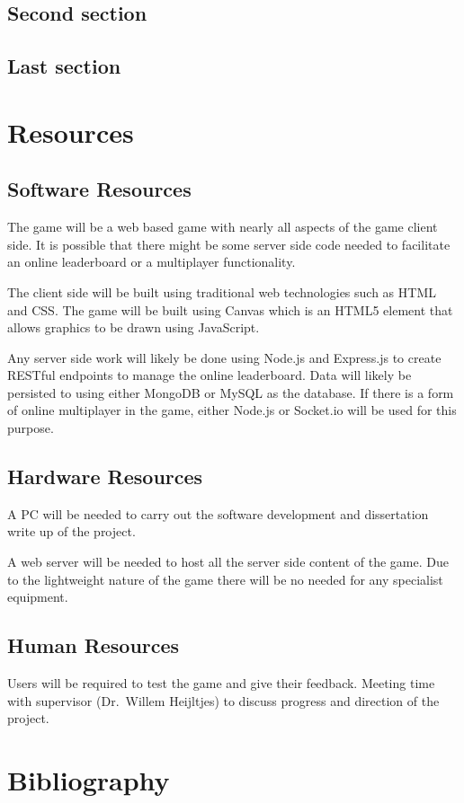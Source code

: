 \documentclass[12pt,a4paper]{report}
\begin{document}
\section{Second section}
\section{Last section}

\chapter{Resources}
\section{Software Resources}
The game will be a web based game with nearly all aspects of the game client side. It is possible that there might be some server side code needed to facilitate an online leaderboard or a multiplayer functionality.

The client side will be built using traditional web technologies such as HTML and CSS. The game will be built using Canvas which is an HTML5 element that allows graphics to be drawn using JavaScript. 

Any server side work will likely be done using Node.js and Express.js to create RESTful endpoints to manage the online leaderboard. Data will likely be persisted to using either MongoDB or MySQL as the database. If there is a form of online multiplayer in the game, either Node.js or Socket.io will be used for this purpose.

\section{Hardware Resources}
A PC will be needed to carry out the software development and dissertation write up of the project. 

A web server will be needed to host all the server side content of the game. Due to the lightweight nature of the game there will be no needed for any specialist equipment.

\section{Human Resources}
Users will be required to test the game and give their feedback. 
Meeting time with supervisor (Dr.~Willem Heijltjes) to discuss progress and direction of the project.
\chapter{Bibliography}%
\end{document}
